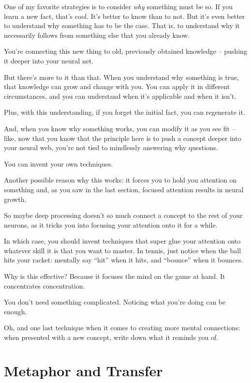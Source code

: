 One of my favorite strategies is to consider \textit{why} something must be
so. If you learn a new fact, that's cool. It's better to know than to
not. But it's even better to understand why something has to be the case. That is, to
understand why it necessarily follows from something else that you already know.

You're connecting this new thing to old, previously obtained knowledge --
pushing it deeper into your neural net.

But there's more to it than that. When you understand why something is true,
that knowledge can grow and change with you. You can apply it in different
circumstances, and you can understand when it's applicable and when it isn't.

Plus, with this understanding, if you forget the initial fact, you can
regenerate it.

And, when you know why something works, you can modify it as you see fit --
like, now that you know that the principle here is to push a concept
deeper into your neural web, you're not tied to mindlessly answering why
questions.

You can invent your own techniques.

Another possible reason why this works: it forces you to hold you
attention on something and, as you saw in the last section, focused attention
results in neural growth.

So maybe deep processing doesn't so much connect a concept to the rest of your
neurons, as it tricks you into focusing your attention onto it for a while.

In which case, you should invent techniques that super glue your attention onto
whatever skill it is that you want to master. In tennis, just notice when the
ball hits your racket: mentally say ``hit'' when it hits, and ``bounce'' when it
bounces.

Why is this effective? Because it focuses the mind on the game at hand. It
concentrates concentration.

You don't need something complicated. Noticing what you're doing can be enough.

Oh, and one last technique when it comes to creating more mental connections:
when presented with a new concept, write down what it reminds you of. 

\section{Metaphor and Transfer}

